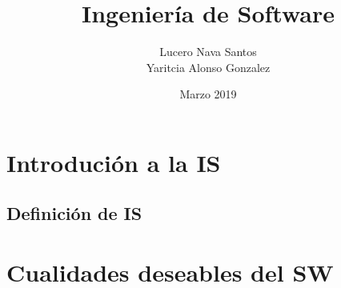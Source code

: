 \documentclass{book}
\title{Ingenier\'ia de Software}
\author{ Lucero Nava Santos \\ Yaritcia Alonso Gonzalez \\  }
\date{Marzo 2019}
\begin{document}
\maketitle

\chapter{Introduci\'on a la IS}
\section{ Definici\'on de IS}

\chapter{Cualidades deseables del SW}

%  

%
\end{document}
